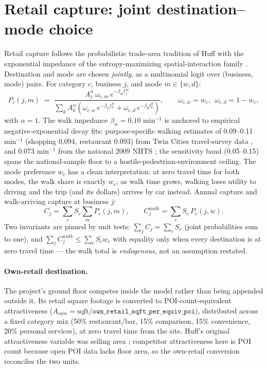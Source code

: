 \documentclass[11pt]{article}
\newcommand{\assum}[1]{\texttt{#1}}
\begin{document}
\section{Retail capture: joint destination--mode choice}
\label{sec:capture}

Retail capture follows the probabilistic trade-area tradition of Huff
\cite{huff1963, huff1964} with the exponential impedance of the
entropy-maximizing spatial-interaction family \cite{wilson1971}. Destination
and mode are chosen \emph{jointly}, as a multinomial logit \cite{mcfadden1974,
benakiva1985} over (business, mode) pairs. For category $c$, business $j$, and
mode $m \in \{w, d\}$:
\begin{equation}
P_c(j, m) \;=\;
\frac{A_j^{\alpha}\, \omega_{c,m}\, e^{-\beta_m t^m_j}}
     {\sum_k A_k^{\alpha} \left( \omega_{c,w}\, e^{-\beta_w t^w_k}
       + \omega_{c,d}\, e^{-\beta_d t^d_k} \right)},
\qquad
\omega_{c,w} = w_c,\ \ \omega_{c,d} = 1 - w_c,
\label{eq:joint}
\end{equation}
with $\alpha = 1$. The walk impedance $\beta_w = 0.10$ min$^{-1}$ is anchored
to empirical negative-exponential decay fits: purpose-specific walking
estimates of 0.09--0.11 min$^{-1}$ (shopping 0.094, restaurant 0.093) from
Twin Cities travel-survey data \cite{iacono2008}, and 0.073 min$^{-1}$ from
the national 2009 NHTS \cite{yang2012}; the sensitivity band (0.05--0.15)
spans the national-sample floor to a hostile-pedestrian-environment ceiling.
The mode preference $w_c$ has a clean interpretation: at
zero travel time for both modes, the walk share is exactly $w_c$; as walk time
grows, walking loses utility to driving and the trip (and its dollars) arrives
by car instead. Annual capture and walk-arriving capture at business $j$:
\begin{equation}
C_j = \sum_c S_c \sum_m P_c(j, m), \qquad
C^{walk}_j = \sum_c S_c \, P_c(j, w).
\end{equation}
Two invariants are pinned by unit tests: $\sum_j C_j = \sum_c S_c$ (joint
probabilities sum to one), and $\sum_j C^{walk}_j \leq \sum_c S_c w_c$ with
equality only when every destination is at zero travel time --- the walk total
is \emph{endogenous}, not an assumption restated.

\paragraph{Own-retail destination.} The project's ground floor competes inside
the model rather than being appended outside it. Its retail square footage is
converted to POI-count-equivalent attractiveness
($A_{own} = \mathrm{sqft} / \assum{own\_retail\_sqft\_per\_equiv\_poi}$),
distributed across a fixed category mix (50\% restaurant/bar, 15\% comparison,
15\% convenience, 20\% personal services), at zero travel time from the site.
Huff's original attractiveness variable was selling area \cite{huff1963};
competitor attractiveness here is POI count because open POI data lacks floor
area, so the own-retail conversion reconciles the two units.
\end{document}
